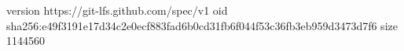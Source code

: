 version https://git-lfs.github.com/spec/v1
oid sha256:e49f3191e17d34c2e0ecf883fad6b0cd31fb6f044f53c36fb3eb959d3473d7f6
size 1144560
